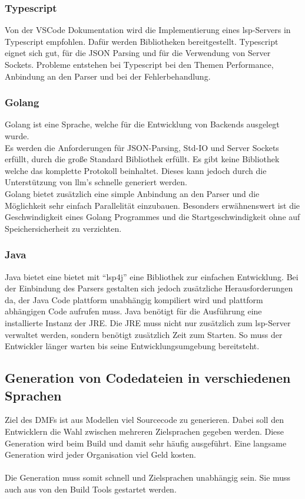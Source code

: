 \documentclass[./einleitung.tex]{subfiles}
\begin{document}
\subsubsection{Typescript}
Von der VSCode Dokumentation wird die Implementierung eines \acrlong{lsp}-Servers in Typescript empfohlen.
Dafür werden Bibliotheken bereitgestellt.
Typescript eignet sich gut, für die JSON Parsing und für die Verwendung von Server Sockets.
Probleme entstehen bei Typescript bei den Themen Performance, Anbindung an den Parser und bei der Fehlerbehandlung.

\subsubsection{Golang}
Golang ist eine Sprache, welche für die Entwicklung von Backends ausgelegt wurde. \\
Es werden die Anforderungen für JSON-Parsing, Std-IO und Server Sockets erfüllt, durch die große Standard Bibliothek erfüllt.
Es gibt keine Bibliothek welche das komplette Protokoll beinhaltet.
Dieses kann jedoch durch die Unterstützung von \acrshort{llm}'s schnelle generiert werden.\\
Golang bietet zusätzlich eine simple Anbindung an den Parser und die Möglichkeit sehr einfach Parallelität einzubauen.
Besonders erwähnenswert ist die Geschwindigkeit eines Golang Programmes und die Startgeschwindigkeit ohne auf Speichersicherheit zu verzichten.

\subsubsection{Java}
Java bietet eine bietet mit ``lsp4j'' eine Bibliothek zur einfachen Entwicklung.
Bei der Einbindung des Parsers gestalten sich jedoch zusätzliche Herausforderungen da, der Java Code plattform unabhängig kompiliert wird und plattform abhängigen Code aufrufen muss.
Java benötigt für die Ausführung eine installierte Instanz der JRE. Die JRE muss nicht nur zusätzlich zum \acrlong{lsp}-Server verwaltet werden, sondern benötigt zusätzlich Zeit zum Starten.
So muss der Entwickler länger warten bis seine Entwicklungsumgebung bereitsteht.


\subsection{Generation von Codedateien in verschiedenen Sprachen}
Ziel des DMFs ist aus Modellen viel Sourcecode zu generieren.
Dabei soll den Entwicklern die Wahl zwischen mehreren Zielsprachen gegeben werden.
Diese Generation wird beim Build und damit sehr häufig ausgeführt.
Eine langsame Generation wird jeder Organisation viel Geld kosten.
\\\\
Die Generation muss somit schnell und Zielsprachen unabhängig sein.
Sie muss auch aus von den Build Tools gestartet werden.
\end{document}
